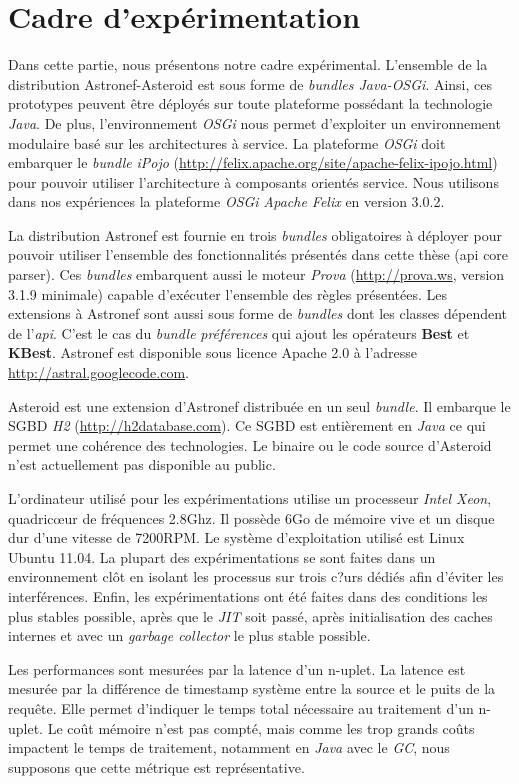 \section{Cadre d'expérimentation}\label{sec:valid:perfs:cadre}
Dans cette partie, nous présentons notre cadre expérimental. L'ensemble de la distribution Astronef-Asteroid est sous forme de \textit{bundles Java-OSGi}. Ainsi, ces prototypes peuvent être déployés sur toute plateforme possédant la technologie \textit{Java}. De plus, l'environnement \textit{OSGi} nous permet d'exploiter un environnement modulaire basé sur les architectures à service. La plateforme \textit{OSGi} doit embarquer le \textit{bundle} \textit{iPojo} (\url{http://felix.apache.org/site/apache-felix-ipojo.html}) pour pouvoir utiliser l'architecture à composants orientés service. Nous utilisons dans nos expériences la plateforme \textit{OSGi} \textit{Apache Felix} en version 3.0.2.

La distribution Astronef est fournie en trois \textit{bundles} obligatoires à déployer pour pouvoir utiliser l'ensemble des fonctionnalités présentés dans cette thèse (api core parser). Ces \textit{bundles} embarquent aussi le moteur \textit{Prova} (\url{http://prova.ws}, version 3.1.9 minimale) capable d'exécuter l'ensemble des règles présentées. Les extensions à Astronef sont aussi sous forme de \textit{bundles} dont les classes dépendent de l'\textit{api}. C'est le cas du \textit{bundle} \textit{préférences} qui ajout les opérateurs \textbf{Best} et \textbf{KBest}. Astronef est disponible sous licence Apache 2.0 à l'adresse \url{http://astral.googlecode.com}.

Asteroid est une extension d'Astronef distribuée en un seul \textit{bundle}. Il embarque le SGBD \textit{H2} (\url{http://h2database.com}). Ce SGBD est entièrement en \textit{Java} ce qui permet une cohérence des technologies. Le binaire ou le code source d'Asteroid n'est actuellement pas disponible au public.

L'ordinateur utilisé pour les expérimentations utilise un processeur \textit{Intel Xeon}, quadricœur de fréquences 2.8Ghz. Il possède 6Go de mémoire vive et un disque dur d'une vitesse de 7200RPM. Le système d'exploitation utilisé est Linux Ubuntu 11.04. La plupart des expérimentations se sont faites dans un environnement clôt en isolant les processus sur trois c?urs dédiés afin d'éviter les interférences. Enfin, les expérimentations ont été faites dans des conditions les plus stables possible, après que le \textit{JIT} soit passé, après initialisation des caches internes et avec un \textit{garbage collector} le plus stable possible.

Les performances sont mesurées par la latence d'un n-uplet. La latence est mesurée par la différence de timestamp système entre la source et le puits de la requête. Elle permet d'indiquer le temps total nécessaire au traitement d'un n-uplet. Le coût mémoire n'est pas compté, mais comme les trop grands coûts impactent le temps de traitement, notamment en \textit{Java} avec le \textit{GC}, nous supposons que cette métrique est représentative.